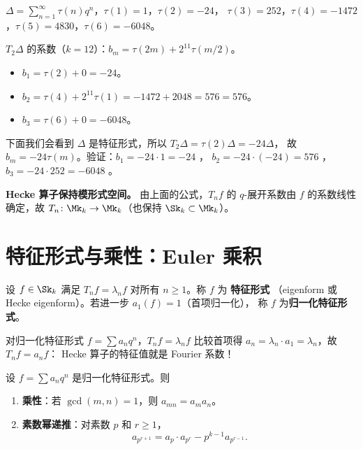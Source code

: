 \begin{example}
\label{ex:T2-Delta-explicit}
$\Delta = \sum_{n=1}^\infty \tau(n) q^n$，$\tau(1)=1$，$\tau(2)=-24$，
$\tau(3)=252$，$\tau(4)=-1472$，$\tau(5)=4830$，$\tau(6)=-6048$。

$T_2\Delta$ 的系数（$k=12$）：$b_m = \tau(2m) + 2^{11}\tau(m/2)$。
\begin{itemize}
  \item $b_1 = \tau(2) + 0 = -24$。
  \item $b_2 = \tau(4) + 2^{11}\tau(1) = -1472 + 2048 = 576 = 576$。
  \item $b_3 = \tau(6) + 0 = -6048$。
\end{itemize}
下面我们会看到 $\Delta$ 是特征形式，所以 $T_2\Delta = \tau(2)\Delta = -24\Delta$，
故 $b_m = -24\tau(m)$。验证：$b_1 = -24 \cdot 1 = -24$ \checkmark，
$b_2 = -24 \cdot (-24) = 576$ \checkmark，$b_3 = -24 \cdot 252 = -6048$ \checkmark。
\end{example}

\textbf{Hecke 算子保持模形式空间。}
由上面的公式，$T_n f$ 的 $q$-展开系数由 $f$ 的系数线性确定，故 $T_n\colon \Mk_k \to \Mk_k$（也保持 $\Sk_k \subset \Mk_k$）。


\section{特征形式与乘性：Euler 乘积}
\label{sec:hecke-eigenforms}

\begin{definition}[特征形式]
\label{def:eigenform}
设 $f \in \Sk_k$ 满足 $T_n f = \lambda_n f$ 对所有 $n \geq 1$。称 $f$ 为 \textbf{特征形式}
（eigenform 或 Hecke eigenform）。若进一步 $a_1(f) = 1$（首项归一化），
称 $f$ 为\textbf{归一化特征形式}。
\end{definition}

\begin{remark}
对归一化特征形式 $f = \sum a_n q^n$，$T_n f = \lambda_n f$ 比较首项得
$a_n = \lambda_n \cdot a_1 = \lambda_n$，故 $T_n f = a_n f$：
Hecke 算子的特征值就是 Fourier 系数！
\end{remark}

\begin{theorem}[乘性定理]
\label{thm:multiplicativity}
设 $f = \sum a_n q^n$ 是归一化特征形式。则
\begin{enumerate}
  \item[(i)] \textbf{乘性}：若 $\gcd(m,n)=1$，则 $a_{mn} = a_m a_n$。
  \item[(ii)] \textbf{素数幂递推}：对素数 $p$ 和 $r \geq 1$，
        \[
          a_{p^{r+1}} = a_p \cdot a_{p^r} - p^{k-1} a_{p^{r-1}}.
        \]
\end{enumerate}
\end{theorem}

